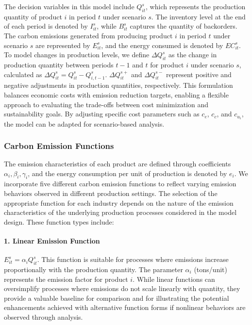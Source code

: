 \documentclass[final,3p,times,review,authoryear]{elsarticle}
\begin{document}
The decision variables in this model include \( Q_{it}^s \), which represents the production quantity of product \( i \) in period \( t \) under scenario \( s \). The inventory level at the end of each period is denoted by \( I_{it}^s \), while \( B_{it}^s \) captures the quantity of backorders. The carbon emissions generated from producing product \( i \) in period \( t \) under scenario \( s \) are represented by \( E_{it}^s \), and the energy consumed is denoted by \( EC_{it}^s \). To model changes in production levels, we define \( \Delta Q_{it}^s \) as the change in production quantity between periods \( t-1 \) and \( t \) for product \( i \) under scenario \( s \), calculated as \( \Delta Q_{it}^s = Q_{it}^s - Q_{i,t-1}^s \). 
\( \Delta Q_{it}^{s+} \) and \( \Delta Q_{it}^{s-} \) represent positive and negative adjustments in production quantities, respectively. This formulation balances economic costs with emission reduction targets, enabling a flexible approach to evaluating the trade-offs between cost minimization and sustainability goals. By adjusting specific cost parameters such as \( c_e \), \( c_c \), and \( c_{u_i} \), the model can be adapted for scenario-based analysis.


\subsubsection{Carbon Emission Functions}

The emission characteristics of each product are defined through coefficients \( \alpha_i, \beta_i, \gamma_i \), and the energy consumption per unit of production is denoted by \( e_i \). We incorporate five different carbon emission functions to reflect varying emission behaviors observed in different production settings. The selection of the appropriate function for each industry depends on the nature of the emission characteristics of the underlying production processes considered in the model design. These function types include:

\paragraph{1. Linear Emission Function}
$E_{it}^s = \alpha_i Q_{it}^s$. This function is suitable for processes where emissions increase proportionally with the production quantity. The parameter $\alpha_i$ (tons/unit) represents the emission factor for product $i$. While linear functions can oversimplify processes where emissions do not scale linearly with quantity, they provide a valuable baseline for comparison and for illustrating the potential enhancements achieved with alternative function forms if nonlinear behaviors are observed through analysis.
\end{document}
